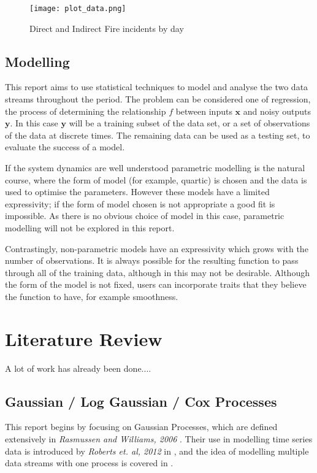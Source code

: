 \documentclass[a4paper,11pt]{report}
\begin{document}
\begin{figure}
\centering
\texttt{[image: plot\_data.png]}
\caption{Direct and Indirect Fire incidents by day}
\label{fig:sigactsdata}
\end{figure}

\section{Modelling}

This report aims to use statistical techniques to model and analyse the two data streams throughout the period. The problem can be considered one of regression, the process of determining the relationship \(f\) between inputs \(\mathbf{x}\) and noisy outputs \(\mathbf{y}\). In this case \(\mathbf{y}\) will be a training subset of the data set, or a set of observations of the data at discrete times. The remaining data can be used as a testing set, to evaluate the success of a model.

If the system dynamics are well understood parametric modelling is the natural course, where the form of model (for example, quartic) is chosen and the data is used to optimise the parameters. However these models have a limited expressivity; if the form of model chosen is not appropriate a good fit is impossible. As there is no obvious choice of model in this case, parametric modelling will not be explored in this report.

Contrastingly, non-parametric models have an expressivity which grows with the number of observations. It is always possible for the resulting function to pass through all of the training data, although in this may not be desirable. Although the form of the model is not fixed, users can incorporate traits that they believe the function to have, for example smoothness. 



\chapter{Literature Review}
A lot of work has already been done....

\section{Gaussian / Log Gaussian / Cox Processes}
This report begins by focusing on Gaussian Processes, which are defined extensively in \textit{Rasmussen and Williams, 2006} \cite{GP4ML}. Their use in modelling time series data is introduced by \textit{Roberts et. al, 2012} in \cite{GP-robots}, and the idea of modelling multiple data streams with one process is covered in \cite{multi-outputGP}.
\end{document}
